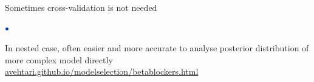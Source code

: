 \documentclass[english,t]{beamer}
\newenvironment{list1}{
   \begin{list}{$\color{list1}\bullet$}{\itemsep=6pt}}{
  \end{list}}
\newenvironment{list2}{
  \begin{list}{-}{\baselineskip=12pt\itemsep=2pt}}{
  \end{list}}
\begin{document}
    

\begin{frame}{Sometimes cross-validation is not needed}

\begin{list1}
\item<+-> In nested case, often easier and
  more accurate to analyse posterior distribution of more complex
  model directly \\
  {\small \url{avehtari.github.io/modelselection/betablockers.html}}
\end{list1}

\end{frame}
\end{document}
